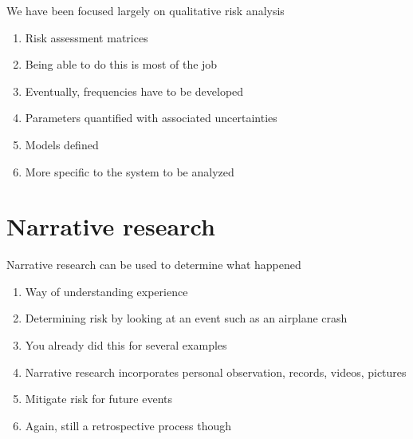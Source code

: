 \documentclass[aspectratio=1610,pdftex,dvipsnames,compress,xcolor={dvipsnames}]{beamer}
\begin{document}
\begin{frame}{We have been focused largely on qualitative risk analysis}
    \begin{enumerate}[series=outerlist,topsep=0pt,itemsep=17pt,leftmargin=*,label=(\arabic*)]
        \item[]Risk assessment matrices 
        \item[]Being able to do this is most of the job
        \item[]Eventually, frequencies have to be developed
        \item[]Parameters quantified with associated uncertainties
        \item[]Models defined
        \item[]More specific to the system to be analyzed
    \end{enumerate}
\end{frame}


\section{Narrative research}


\addtocounter{framenumber}{-1}
\begin{frame}{Narrative research can be used to determine what happened}
    \begin{enumerate}[series=outerlist,topsep=0pt,itemsep=17pt,leftmargin=*,label=(\arabic*)]
        \item[]Way of understanding experience
        \item[]Determining risk by looking at an event such as an airplane crash
        \item[]You already did this for several examples
        \item[]Narrative research incorporates personal observation, records, videos, pictures
        \item[]Mitigate risk for future events
        \item[]Again, still a retrospective process though
    \end{enumerate}
\end{frame}
\end{document}
